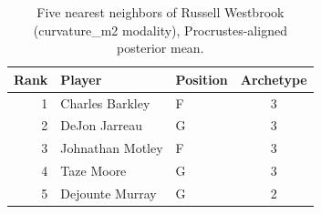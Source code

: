 \begin{table}[htbp]
  \centering\small
  \begin{tabular}{rllc}
    \toprule
    Rank & Player & Position & Archetype \\
    \midrule
    1 & Charles Barkley & F & 3 \\
    2 & DeJon Jarreau & G & 3 \\
    3 & Johnathan Motley & F & 3 \\
    4 & Taze Moore & G & 3 \\
    5 & Dejounte Murray & G & 2 \\
    \bottomrule
  \end{tabular}
  \caption{Five nearest neighbors of Russell Westbrook (curvature_m2 modality), Procrustes-aligned posterior mean.}
  \label{tab:Russell_Westbrook_neighbors_curvature_m2}
\end{table}

